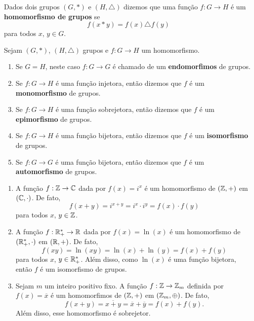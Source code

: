 \begin{definicao}
	Dados dois grupos $(G, *)$ e $(H,\triangle)$ dizemos que uma fun\c{c}\~ao $f : G \to H$ \'e um \textbf{homomorfismo de grupos} se
	\[
		f(x * y) = f(x)\triangle f(y)
	\]
	para todos $x$, $y \in G$.
\end{definicao}

\begin{observacao}
	Sejam $(G, *)$, $(H, \triangle)$ grupos e $f : G \to H$ um homomorfismo.
	\begin{enumerate}[label={\arabic*})]
		\item Se $G = H$, neste caso $f : G \to G$ \'e chamado de um \textbf{endomorfimos} de grupos.
		\item Se $f : G \to H$ \'e uma fun\c{c}\~ao injetora, ent\~ao dizemos que $f$ \'e um \textbf{monomorfismo} de grupos.
		\item Se $f : G \to H$ \'e uma fun\c{c}\~ao sobrejetora, ent\~ao dizemos que $f$ \'e um \textbf{epimorfismo} de grupos.
		\item Se $f : G \to H$ \'e uma fun\c{c}\~ao bijetora, ent\~ao dizemos que $f$ \'e um \textbf{isomorfismo} de grupos.
		\item Se $f : G \to G$ \'e uma fun\c{c}\~ao bijetora, ent\~ao dizemos que $f$ \'e um \textbf{automorfismo} de grupos.
	\end{enumerate}
\end{observacao}

\begin{exemplos}
	\begin{enumerate}[label={\arabic*})]
		\item A fun\c{c}\~ao $f : \mathbb{Z} \to \mathbb{C}$ dada por $f(x) = i^x$ \'e um homomorfismo de $(\mathbb{Z}, +)$ em $(\mathbb{C}, \cdot)$. De fato,
		\[
			f(x + y) = i^{x + y} = i^x\cdot i^y = f(x)\cdot f(y)
		\]
		para todos $x$, $y \in \mathbb{Z}$.

		\item A fun\c{c}\~ao $f : \mathbb{R}^*_+ \to \mathbb{R}$ dada por $f(x) = \ln(x)$ \'e um homomorfismo de $(\mathbb{R}^*_+, \cdot)$ em $(\mathbb{R}, +)$. De fato,
		\[
			f(xy) = \ln(xy) = \ln(x) + \ln(y) = f(x) + f(y)
		\]
		para todos $x$, $y \in \mathbb{R}^*_+$. Al\'em disso, como $\ln(x)$ \'e uma fun\c{c}\~ao bijetora, ent\~ao $f$ \'e um isomorfismo de grupos.

		\item Sejam $m$ um inteiro positivo fixo. A fun\c{c}\~ao $f: \mathbb{Z} \to \mathbb{Z}_m$ definida por $f(x) = \overline{x}$ \'e um homomorfimos de $(\mathbb{Z}, +)$ em $(\mathbb{Z}_m, \oplus)$. De fato,
		\[
			f(x + y) = \overline{x + y} = \overline{x} + \overline{y} = f(x) + f(y).
		\]
		Al\'em disso, esse homomorfismo \'e sobrejetor.
	\end{enumerate}
\end{exemplos}

